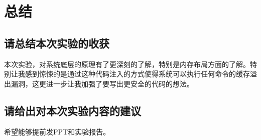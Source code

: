\section{总结}

\subsection{请总结本次实验的收获}
本次实验，对系统底层的原理有了更深刻的了解，特别是内存布局方面的了解。特别让我感到惊悚的是通过这种代码注入的方式使得系统可以执行任何命令的缓存溢出漏洞，这更进一步让我加强了要写出更安全的代码的想法。

\subsection{请给出对本次实验内容的建议}
希望能够提前发PPT和实验报告。